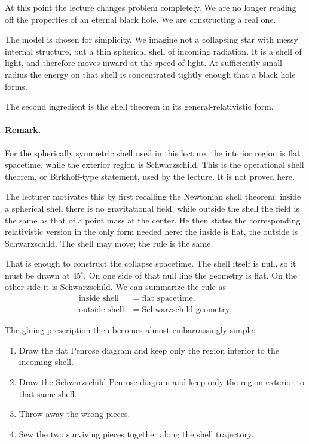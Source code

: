 At this point the lecture changes problem completely. We are no longer reading off the properties of an eternal black hole. We are constructing a real one.

The model is chosen for simplicity. We imagine not a collapsing star with messy internal structure, but a thin spherical shell of incoming radiation. It is a shell of light, and therefore moves inward at the speed of light. At sufficiently small radius the energy on that shell is concentrated tightly enough that a black hole forms.

The second ingredient is the shell theorem in its general-relativistic form.

\paragraph{Remark.} For the spherically symmetric shell used in this lecture, the interior region is flat spacetime, while the exterior region is Schwarzschild. This is the operational shell theorem, or Birkhoff-type statement, used by the lecture. It is not proved here.

The lecturer motivates this by first recalling the Newtonian shell theorem: inside a spherical shell there is no gravitational field, while outside the shell the field is the same as that of a point mass at the center. He then states the corresponding relativistic version in the only form needed here: the inside is flat, the outside is Schwarzschild. The shell may move; the rule is the same.

That is enough to construct the collapse spacetime. The shell itself is null, so it must be drawn at \(45^\circ\). On one side of that null line the geometry is flat. On the other side it is Schwarzschild. We can summarize the rule as
\begin{equation}
\begin{aligned}
\text{inside shell} &= \text{flat spacetime},\\
\text{outside shell} &= \text{Schwarzschild geometry}.
\end{aligned}
\end{equation}

The gluing prescription then becomes almost embarrassingly simple:

\begin{enumerate}
\item Draw the flat Penrose diagram and keep only the region interior to the incoming shell.
\item Draw the Schwarzschild Penrose diagram and keep only the region exterior to that same shell.
\item Throw away the wrong pieces.
\item Sew the two surviving pieces together along the shell trajectory.
\end{enumerate}

